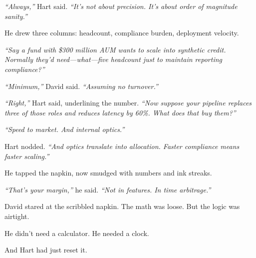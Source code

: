 \textit{``Always,''} Hart said. \textit{``It’s not about precision. It’s about order of magnitude sanity.''}

He drew three columns: headcount, compliance burden, deployment velocity.

\textit{``Say a fund with \$300 million AUM wants to scale into synthetic credit. Normally they’d need---what---five headcount 
just to maintain reporting compliance?''}

\textit{``Minimum,''} David said. \textit{``Assuming no turnover.''}

\textit{``Right,''} Hart said, underlining the number. \textit{``Now suppose your pipeline replaces three of those roles 
and reduces latency by 60\%. What does that buy them?''}

\textit{``Speed to market. And internal optics.''}

Hart nodded. \textit{``And optics translate into allocation. Faster compliance means faster scaling.''}

He tapped the napkin, now smudged with numbers and ink streaks.

\textit{``That’s your margin,''} he said. \textit{``Not in features. In time arbitrage.''}

David stared at the scribbled napkin. The math was loose. But the logic was airtight.

He didn’t need a calculator. He needed a clock.

And Hart had just reset it.

\medskip


